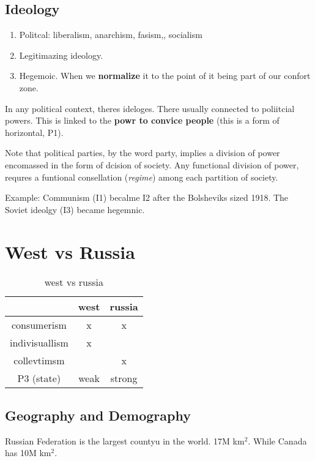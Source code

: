 \subsection{Ideology} 

\begin{enumerate}
	\item Politcal: liberalism, anarchism, fasism,, socialism
	\item Legitimazing ideology.
	\item Hegemoic. When we \textbf{normalize} it to the point of it being part of our confort zone.
\end{enumerate}
	

In any political context, theres ideloges. There usually connected to poliitcial powers. This is linked to the \textbf{powr to convice people} (this is a form of horizontal, P1). 

Note that political parties, by the word party, implies a division of power encomassed in the form of dcision of society.
Any functional division of power, requres a funtional consellation (\textit{regime}) among each partition of society.

Example:
Communism (I1) becalme I2 after the Bolsheviks sized 1918. The Soviet ideolgy (I3) became hegemnic.


\section{West vs Russia}

\begin{table}[H]
	\centering
	\caption{west vs russia}\label{tab:west_russia}
	\begin{tabular}{ccc}
		\hline
		  				& west  & russia   \\
		\hline
		 consumerism 	& x  & x   \\
		 indivisuallism & x  &    \\
		 collevtimsm 	&   & x    \\
		 P3 (state) 	& weak  & strong    \\
		\hline
	\end{tabular}
\end{table}


\subsection{Geography and Demography}

Russian Federation is the largest countyu in the world. 17M km$^2$. While Canada has 10M km$^2$.

